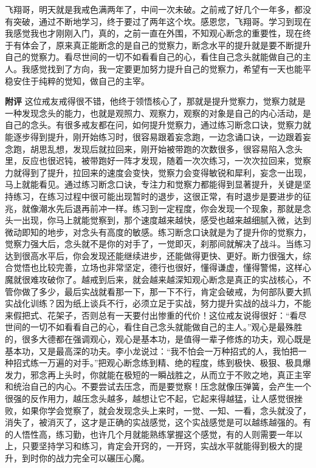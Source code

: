 \begin{case}
    飞翔哥，明天就是我戒色满两年了，中间一次未破。之前戒了好几个一年多，都没有突破，通过不断地学习，终于要过了两年这个坎。感恩您，飞翔哥。学习到现在我感觉我也才刚刚入门，真的，之前一直在外围，不知观心断念的重要性，现在终于有体会了，原来真正能断念的是自己的觉察力，断念水平的提升就是要不断提升自己的觉察力。看尽世间的一切不如看看自己的心，看住自己念头就能做自己的主人。我感觉找到了方向，我一定要更加努力提升自己的觉察力，希望有一天也能平稳安住于纯粹的觉知，做自己的主宰。

    \textbf{附评} 这位戒友戒得很不错，他终于领悟核心了，那就是提升觉察力，觉察力就是一种发现念头的能力，也就是观照力、观察力，观察的对象是自己的内心活动，是自己的念头。有很多戒友都在问，如何提升觉察力，通过练习断念口诀，觉察力就能逐步得到提升，刚开始练习时，很容易跟着妄念跑，一边念诵口诀，一边跟着妄念跑，胡思乱想，发现后就拉回来，刚开始被带跑的次数很多，很容易陷入念头里，反应也很迟钝，被带跑好一阵才发现，随着一次次练习，一次次拉回来，觉察力就得到了提升，拉回来的速度会变快，觉察力会变得敏锐和犀利，妄念一出现，马上就能看见。通过练习断念口诀，专注力和觉察力都能得到显著提升，关键是坚持练习，在练习过程中很可能出现暂时的退步，这很正常，有时退步是要进步的征兆，就像潮水先后退再前冲一样。练习到一定程度，你会发现一个现象，那就是念头一出现，你马上就能觉察到，那个速度越来越快，感受也越来越细腻入微，达到微动即知的地步，对念头有高度的敏感。练习断念口诀就是为了提升你的觉察力，觉察力强大后，念头就不是你的对手了，一觉即灭，刹那间就解决了战斗。当练习达到很高水平后，你会发现还能继续进步，还能做得更快、更好。断力很强大，综合觉悟也比较完善，立场也非常坚定，德行也很好，懂得谦虚，懂得警惕，这样心魔就很难攻破你了。越戒到后来，就会越来越深知观心断念是真正的实战核心，不管你做了多少，最后实战就看那一下，那一下不行，肯定会破戒，为何部队要大抓实战化训练？因为纸上谈兵不行，必须立足于实战，努力提升实战的战斗力，不能来假把式、花架子，否则总有一天要付出惨重的代价！这位戒友说得很好：“看尽世间的一切不如看看自己的心，看住自己念头就能做自己的主人。”观心是最殊胜的，很多大德都在强调观心，观心是基本功，是值得一辈子修炼的功夫，观心既是基本功，又是最高深的功夫。李小龙说过：“我不怕会一万种招式的人，我怕把一种招式练一万遍的对手。”把观心断念练到精、绝的程度，练到极快、极狠、极具爆发力，邪念再上头时，你就能在极短的一瞬战胜之，从而立于不败之地，真正主宰和统治自己的内心。不要尝试去压念，而是要觉察！压念就像压弹簧，会产生一个很强的反作用力，越压念头越多，越想让它不起，它起来得越猛，让人感觉很挫败，如果你学会觉察了，就会发现念头上来时，一觉、一知、一看，念头就没了，消失了，被消灭了，这才是正确的实战感觉，这个实战感觉是可以越练越强的。有的人悟性高，练习勤，也许几个月就能熟练掌握这个感觉，有的人则需要一年以上，只要坚持学习和练习，肯定会开窍的，一开窍，实战水平就能得到极大的提升，到时你的战力完全可以碾压心魔。
\end{case}

